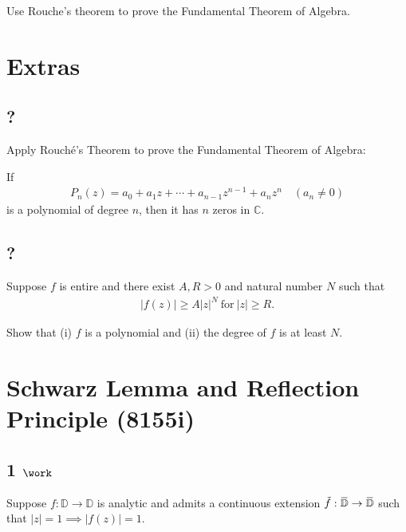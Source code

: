 Use Rouche's theorem to prove the Fundamental Theorem of Algebra.

\hypertarget{extras}{%
\section{Extras}\label{extras}}

\hypertarget{section-15}{%
\subsection{?}\label{section-15}}

Apply Rouché's Theorem to prove the Fundamental Theorem of Algebra:

If
\begin{align*}
P_n(z) = a_0 + a_1z + \cdots + a_{n-1}z^{n-1} + a_nz^n\quad  (a_n \neq 0)
\end{align*}
is a polynomial of degree \(n\), then it has \(n\) zeros in
\(\mathbb{C}\).

\hypertarget{section-16}{%
\subsection{?}\label{section-16}}

Suppose \(f\) is entire and there exist \(A, R >0\) and natural number
\(N\) such that
\begin{align*}|f(z)| \geq A |z|^N\ \text{for}\ |z| \geq R.\end{align*}

Show that (i) \(f\) is a polynomial and (ii) the degree of \(f\) is at
least \(N\).

\hypertarget{schwarz-lemma-and-reflection-principle-8155i}{%
\section{Schwarz Lemma and Reflection Principle
(8155i)}\label{schwarz-lemma-and-reflection-principle-8155i}}

\hypertarget{work-67}{%
\subsection{\texorpdfstring{1
\(\work\)}{1 \textbackslash work}}\label{work-67}}

Suppose \(f:{\mathbb{D}}\to{\mathbb{D}}\) is analytic and admits a
continuous extension
\(\tilde f: \mkern 1.5mu\overline{\mkern-1.5mu{\mathbb{D}}\mkern-1.5mu}\mkern 1.5mu\to \mkern 1.5mu\overline{\mkern-1.5mu{\mathbb{D}}\mkern-1.5mu}\mkern 1.5mu\)
such that
\({\left\lvert {z} \right\rvert} = 1 \implies {\left\lvert {f(z)} \right\rvert} = 1\).

